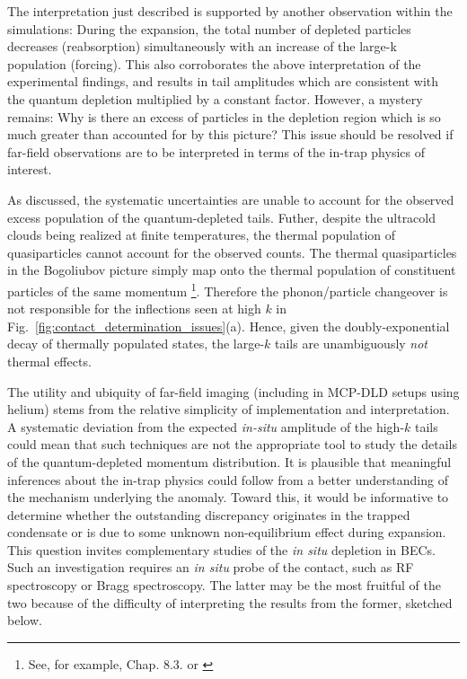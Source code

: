 {	The interpretation just described is supported by another observation within the simulations:
	During the expansion, the total number of depleted particles decreases (reabsorption) simultaneously with an increase of the large-k population (forcing). 
	This {also corroborates the above interpretation} %
	of the experimental findings, and results in tail amplitudes which are consistent with the quantum depletion multiplied by a constant factor. 
	However, a mystery remains: Why is there an excess of particles in the depletion region which is so much greater than accounted for by this picture? 
	This issue should be resolved if far-field observations are to be interpreted in terms of the in-trap physics of interest. 
	
	As discussed, the systematic uncertainties are unable to account for the observed excess population of the quantum-depleted tails.
	Futher, despite the ultracold clouds being realized at finite temperatures, the thermal population of quasiparticles cannot account for the observed counts. 
	The thermal quasiparticles in the Bogoliubov picture simply map onto the thermal population of constituent particles of the same momentum \footnote{See, for example, \cite{PethickSmith} Chap. 8.3. or \cite{Vogels02}}. 
	{Therefore the phonon/particle changeover is not responsible for the inflections seen at high $k$ in Fig.~\ref{fig:contact_determination_issues}(a).} 
	Hence, given the doubly-exponential decay of thermally populated states, the large-$k$ tails are unambiguously \emph{not} thermal effects. 

	The utility and ubiquity of far-field imaging (including in MCP-DLD setups using helium) stems from the relative simplicity of implementation and interpretation.
	A systematic deviation from the expected \emph{in-situ} amplitude of the high-$k$ tails could mean that such techniques are not the appropriate tool to study the details of the quantum-depleted momentum distribution.
	It is plausible that meaningful inferences about the in-trap physics could follow from  a better understanding of the mechanism underlying the anomaly.
	Toward this, it would be informative to determine whether the outstanding discrepancy originates in the trapped condensate or is due to some unknown non-equilibrium effect during expansion.
	This question invites complementary studies of the \emph{in situ} depletion in \mhe BECs. 
	Such an investigation requires an \emph{in situ} probe of the contact, such as RF spectroscopy or Bragg spectroscopy.
	The latter may be the most fruitful of the two because of the difficulty of interpreting the results from the former, sketched below.
	
}
